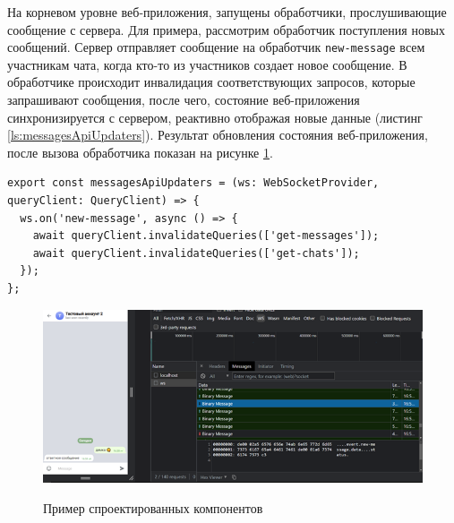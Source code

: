 На корневом уровне веб-приложения, запущены обработчики, прослушивающие сообщение с сервера. Для примера, рассмотрим обработчик поступления новых сообщений. Сервер отправляет сообщение на обработчик \verb|new-message| всем участникам чата, когда кто-то из участников создает новое сообщение.  В обработчике происходит инвалидация соответствующих запросов, которые запрашивают сообщения, после чего, состояние веб-приложения синхронизируется с сервером, реактивно отображая новые данные (листинг \ref{ls:messagesApiUpdaters}). Результат обновления состояния веб-приложения, после вызова обработчика показан на рисунке \ref{fig:web-app-ws-handler}.

\begin{lstlisting}[caption={Глобальный обработчик подписанный на WebSocket событие}, label={ls:messagesApiUpdaters}]
export const messagesApiUpdaters = (ws: WebSocketProvider, queryClient: QueryClient) => {
  ws.on('new-message', async () => {
    await queryClient.invalidateQueries(['get-messages']);
    await queryClient.invalidateQueries(['get-chats']);
  });
}; 
\end{lstlisting}

\begin{figure}[H]
\begin{center}
\includegraphics[width=1.0\hsize]{fig/web-app-ws-handler.png}\\[2mm]
\caption{Пример спроектированных компонентов}\label{fig:web-app-ws-handler}
\end{center}
\end{figure}